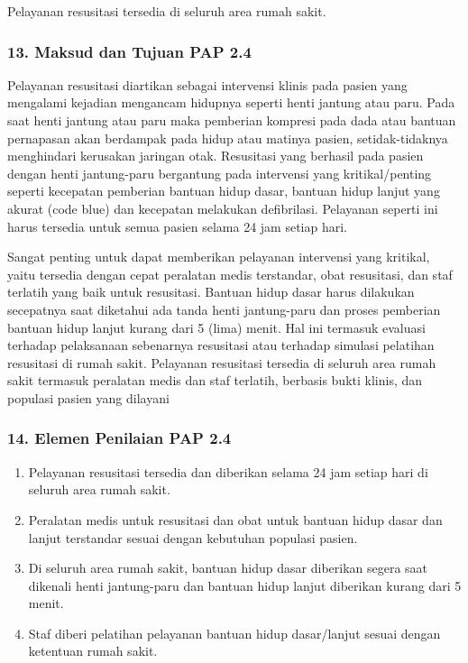 \documentclass[
]{book}
\providecommand{\tightlist}{%
  \setlength{\itemsep}{0pt}\setlength{\parskip}{0pt}}
\begin{document}
Pelayanan resusitasi tersedia di seluruh area rumah sakit.

\hypertarget{maksud-dan-tujuan-pap-2.4}{%
\subsubsection*{13. Maksud dan Tujuan PAP 2.4}\label{maksud-dan-tujuan-pap-2.4}}

Pelayanan resusitasi diartikan sebagai intervensi klinis pada pasien yang mengalami kejadian mengancam hidupnya seperti henti jantung atau paru. Pada saat henti jantung atau paru maka pemberian kompresi pada dada atau bantuan pernapasan akan berdampak pada hidup atau matinya pasien, setidak-tidaknya menghindari kerusakan jaringan otak. Resusitasi yang berhasil pada pasien dengan henti jantung-paru bergantung pada intervensi yang kritikal/penting seperti kecepatan pemberian bantuan hidup dasar, bantuan hidup lanjut yang akurat (code blue) dan kecepatan melakukan defibrilasi. Pelayanan seperti ini harus tersedia untuk semua pasien selama 24 jam setiap hari.

Sangat penting untuk dapat memberikan pelayanan intervensi yang kritikal, yaitu tersedia dengan cepat peralatan medis terstandar, obat resusitasi, dan staf terlatih yang baik untuk resusitasi. Bantuan hidup dasar harus dilakukan secepatnya saat diketahui ada tanda henti jantung-paru dan proses pemberian bantuan hidup lanjut kurang dari 5 (lima) menit. Hal ini termasuk evaluasi terhadap pelaksanaan sebenarnya resusitasi atau terhadap simulasi pelatihan resusitasi di rumah sakit. Pelayanan resusitasi tersedia di seluruh area rumah sakit termasuk peralatan medis dan staf terlatih, berbasis bukti klinis, dan populasi pasien yang dilayani

\hypertarget{elemen-penilaian-pap-2.4}{%
\subsubsection*{14. Elemen Penilaian PAP 2.4}\label{elemen-penilaian-pap-2.4}}

\begin{enumerate}
\def\labelenumi{\alph{enumi}.}
\tightlist
\item
  Pelayanan resusitasi tersedia dan diberikan selama 24 jam setiap hari di seluruh area rumah sakit.
\item
  Peralatan medis untuk resusitasi dan obat untuk bantuan hidup dasar dan lanjut terstandar sesuai dengan kebutuhan populasi pasien.
\item
  Di seluruh area rumah sakit, bantuan hidup dasar diberikan segera saat dikenali henti jantung-paru dan bantuan hidup lanjut diberikan kurang dari 5 menit.
\item
  Staf diberi pelatihan pelayanan bantuan hidup dasar/lanjut sesuai dengan ketentuan rumah sakit.
\end{enumerate}
\end{document}
